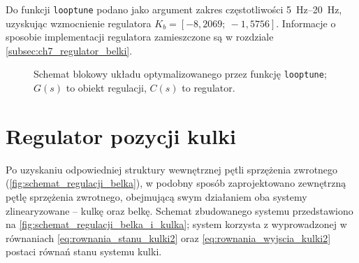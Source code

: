 Do funkcji \texttt{looptune} podano jako argument zakres częstotliwości \SIrange{5}{20}{\hertz}, uzyskując wzmocnienie regulatora $K_b = \left[-8,2069;~  -1,5756\right]$. Informacje o sposobie implementacji regulatora zamieszczone są w rozdziale \ref{subsec:ch7_regulator_belki}.

\begin{figure}[ht]
    \centering
    
    
    \caption{Schemat blokowy układu optymalizowanego przez funkcję \texttt{looptune}; $G(s)$ to obiekt regulacji, $C(s)$ to regulator.}
    \label{fig:schemat_regulacji_looptune}
\end{figure}


\section{Regulator pozycji kulki}
\label{sec:ch6_regulator_kulki}

Po uzyskaniu odpowiedniej struktury wewnętrznej pętli sprzężenia zwrotnego (\cref{fig:schemat_regulacji_belka}), w podobny sposób zaprojektowano zewnętrzną pętlę sprzężenia zwrotnego, obejmującą swym działaniem oba systemy zlinearyzowane -- kulkę oraz belkę. Schemat zbudowanego systemu przedstawiono na \cref{fig:schemat_regulacji_belka_i_kulka}; system korzysta z wyprowadzonej w równaniach \eqref{eq:rownania_stanu_kulki2} oraz \eqref{eq:rownania_wyjscia_kulki2} postaci równań stanu systemu kulki.

